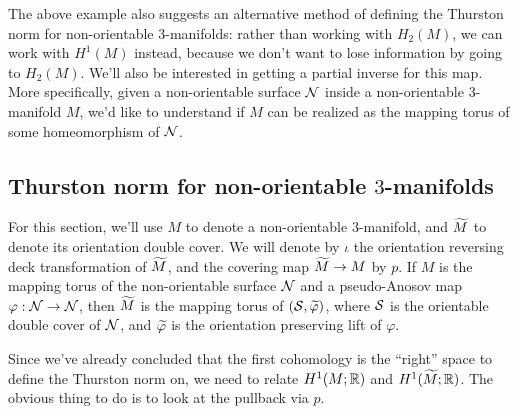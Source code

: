 The above example also suggests an alternative method of defining the Thurston norm for
non-orientable $3$-manifolds: rather than working with $H_2(M)$, we can work with $H^1(M)$ instead,
because we don't want to lose information by going to $H_2(M)$. We'll also be interested in getting
a partial inverse for this map. More specifically, given a non-orientable surface $\mathcal{N}$ inside a
non-orientable $3$-manifold $M$, we'd like to understand if $M$ can be realized as the mapping
torus of some homeomorphism of $\mathcal{N}$.

\subsection{Thurston norm for non-orientable $3$-manifolds}
\label{sec:thurston-norm-non}

For this section, we'll use $M$ to denote a non-orientable $3$-manifold, and $\widetilde{M}$ to denote its
orientation double cover. We will denote by $\iota$ the orientation reversing deck transformation
of $\widetilde{M}$, and the covering map $\widetilde{M} \to M$ by $p$. If $M$ is the mapping torus of the
non-orientable surface $\mathcal{N}$ and a pseudo-Anosov map $\varphi: \mathcal{N} \to \mathcal{N}$, then $\widetilde{M}$ is the
mapping torus of $(\mathcal{S}, \widetilde{\varphi})$, where $\mathcal{S}$ is the orientable double cover of $\mathcal{N}$, and
$\widetilde{\varphi}$ is the orientation preserving lift of $\varphi$.

Since we've already concluded that the first cohomology is the ``right'' space to define the
Thurston norm on, we need to relate $H^1(M; \mathbb{R})$ and $H^1(\widetilde{M}; \mathbb{R})$. The obvious thing to do
is to look at the pullback via $p$.


